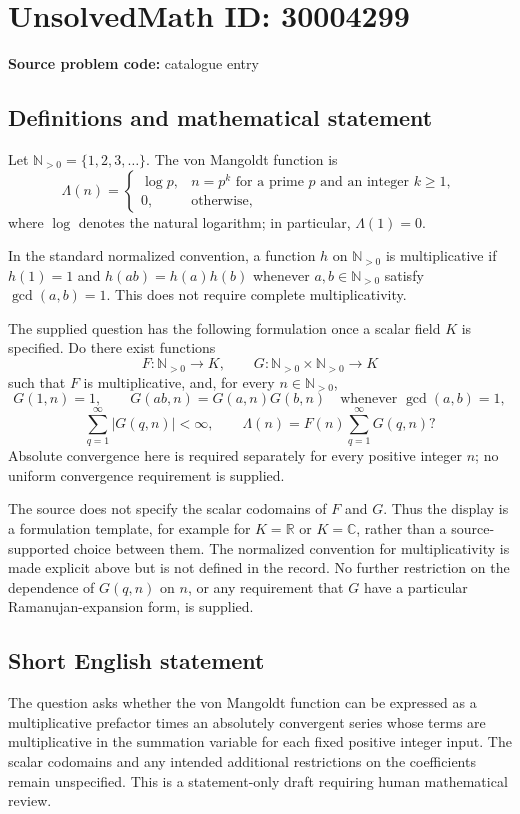 \documentclass[11pt]{article}
\newcommand{\N}{\mathbb{N}}
\newcommand{\R}{\mathbb{R}}
\newcommand{\C}{\mathbb{C}}
\begin{document}
\section*{UnsolvedMath ID: 30004299}
\textbf{Source problem code:} catalogue entry
\subsection{Definitions and mathematical statement}
Let \(\N_{>0}=\{1,2,3,\ldots\}\). The von Mangoldt function is
\[
\Lambda(n)=\begin{cases}
\log p,&n=p^k\text{ for a prime }p\text{ and an integer }k\geq 1,\\
0,&\text{otherwise},
\end{cases}
\]
where \(\log\) denotes the natural logarithm; in particular, \(\Lambda(1)=0\).

In the standard normalized convention, a function \(h\) on \(\N_{>0}\) is multiplicative if \(h(1)=1\) and \(h(ab)=h(a)h(b)\) whenever \(a,b\in\N_{>0}\) satisfy \(\gcd(a,b)=1\). This does not require complete multiplicativity.

The supplied question has the following formulation once a scalar field \(K\) is specified. Do there exist functions
\[
F:\N_{>0}\longrightarrow K,
\qquad
G:\N_{>0}\times\N_{>0}\longrightarrow K
\]
such that \(F\) is multiplicative, and, for every \(n\in\N_{>0}\),
\[
G(1,n)=1,\qquad
G(ab,n)=G(a,n)G(b,n)
\quad\text{whenever }\gcd(a,b)=1,
\]
\[
\sum_{q=1}^{\infty}|G(q,n)|<\infty,
\qquad
\Lambda(n)=F(n)\sum_{q=1}^{\infty}G(q,n)?
\]
Absolute convergence here is required separately for every positive integer \(n\); no uniform convergence requirement is supplied.

The source does not specify the scalar codomains of \(F\) and \(G\). Thus the display is a formulation template, for example for \(K=\R\) or \(K=\C\), rather than a source-supported choice between them. The normalized convention for multiplicativity is made explicit above but is not defined in the record. No further restriction on the dependence of \(G(q,n)\) on \(n\), or any requirement that \(G\) have a particular Ramanujan-expansion form, is supplied.
\subsection{Short English statement}
The question asks whether the von Mangoldt function can be expressed as a multiplicative prefactor times an absolutely convergent series whose terms are multiplicative in the summation variable for each fixed positive integer input. The scalar codomains and any intended additional restrictions on the coefficients remain unspecified. This is a statement-only draft requiring human mathematical review.
\end{document}
